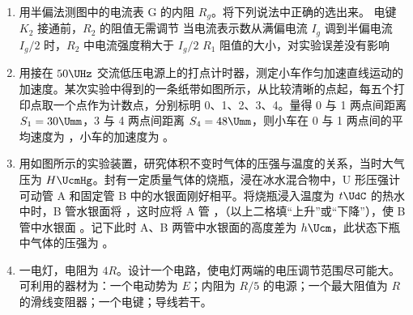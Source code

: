 \documentclass[\gkver]{gaokaozhenti}
\begin{document}
\begin{enumerate}
\item
用半偏法测图中的电流表 G 的内阻 $R_{g}$。将下列说法中正确的选出来。
\onepicture[w=7cm]{}
{电键 $K_{2}$ 接通前，$R_{2}$ 的阻值无需调节}
{当电流表示数从满偏电流 $I_{g}$ 调到半偏电流 $I_{g}/2$ 时，$R_{2}$ 中电流强度稍大于 $I_{g}/2$}
{$R_{1}$ 阻值的大小，对实验误差没有影响}

\item
用接在 $50\UHz$ 交流低压电源上的打点计时器，测定小车作匀加速直线运动的加速度。某次实验中得到的一条纸带如图所示，从比较清晰的点起，每五个打印点取一个点作为计数点，分别标明 0、1、2、3、4。量得 0 与 1 两点间距离 $S_{1} = 30\Umm$，3 与 4 两点间距离 $S_{4} = 48\Umm$，则小车在 0 与 1 两点间的平均速度为 \tkanswer{$0.30\Ums$}，小车的加速度为 \tkanswer{$0.60\Umsq$}。
\onepicture[align=right, w=11cm]{}

\item
用如图所示的实验装置，研究体积不变时气体的压强与温度的关系，当时大气压为 $H\UcmHg$。封有一定质量气体的烧瓶，浸在冰水混合物中，U 形压强计可动管 A 和固定管 B 中的水银面刚好相平。将烧瓶浸入温度为 $t\UdC$ 的热水中时，B 管水银面将 ，这时应将 A 管 ，（以上二格填“上升”或“下降”），使 B 管中水银面 。记下此时 A、B 两管中水银面的高度差为 $h\Ucm$，此状态下瓶中气体的压强为 。
\onepicture[align=right, w=6.5cm]{}

\item
一电灯，电阻为 $4R$。设计一个电路，使电灯两端的电压调节范围尽可能大。可利用的器材为：一个电动势为 $E$；内阻为 $R/5$ 的电源；一个最大阻值为 $R$ 的滑线变阻器；一个电键；导线若干。


\end{enumerate}
\end{document}
